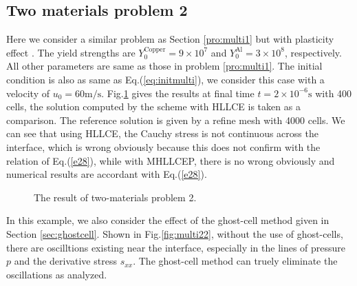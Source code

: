 \documentclass[review]{elsarticle}
\begin{document}
\subsection{Two materials problem 2}
Here we consider a similar problem as Section \ref{pro:multi1} but with plasticity effect . The yield strengths are $Y_0^{\text{Copper}} = 9\times 10^7$ and $Y_0^{\text{Al}} = 3\times 10^8$, respectively. All other  parameters are same as those in problem \ref{pro:multi1}. The initial condition is also as  same as  Eq.(\ref{eq:initmulti}), we consider this case with a velocity of $u_0 = 60 \text{m}/\text{s}$.
Fig.\ref{fig:multi2} gives the results at final time $ t= 2 \times 10^{-6} \text{s}$ with 400 cells, the solution computed by the scheme with HLLCE is taken as a comparison. The reference solution is given by a refine mesh with 4000 cells. We can see that using HLLCE, the Cauchy stress is not continuous across the interface, which is wrong obviously because this does not confirm with the relation of Eq.(\ref{e28}), while with MHLLCEP, there is no wrong obviously and numerical results are accordant with Eq.(\ref{e28}).
\begin{figure}

	  \caption{The result of two-materials  problem 2.}
      \label{fig:multi2}
    \end{figure}

	In this example, we also consider the effect of the ghost-cell method given in Section \ref{sec:ghostcell}. Shown in Fig.\ref{fig:multi22}, without the use of  ghost-cells, there are  oscilltions existing near the interface, especially in  the lines of pressure $p$ and the derivative stress $s_{xx}$.  The ghost-cell method can truely eliminate the oscillations as analyzed.
\end{document}
